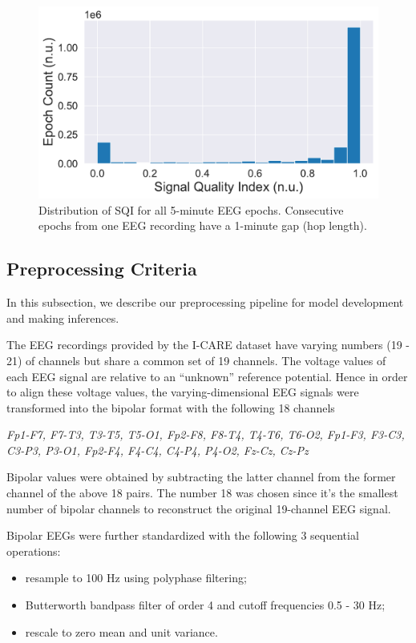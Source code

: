 \begin{figure}[!htp]
\centering
\includegraphics[width=0.95\linewidth]{images/sqi-stats.pdf}
\caption[]{Distribution of SQI for all 5-minute EEG epochs. Consecutive epochs from one EEG recording have a 1-minute gap (hop length).}
\label{fig:sqi-stats}
\end{figure}


\subsection{Preprocessing Criteria}
\label{subsec:data_preproc}

In this subsection, we describe our preprocessing pipeline for model development and making inferences.

The EEG recordings provided by the I-CARE dataset have varying numbers (19 - 21) of channels but share a common set of 19 channels. The voltage values of each EEG signal are relative to an ``unknown'' reference potential. Hence in order to align these voltage values, the varying-dimensional EEG signals were transformed into the bipolar format with the following 18 channels
\begin{indentedquote}{0.3in}
\it Fp1-F7, F7-T3, T3-T5, T5-O1, Fp2-F8, F8-T4, T4-T6, T6-O2, Fp1-F3, F3-C3, C3-P3, P3-O1, Fp2-F4, F4-C4, C4-P4, P4-O2, Fz-Cz, Cz-Pz
\end{indentedquote}
Bipolar values were obtained by subtracting the latter channel from the former channel of the above 18 pairs. The number 18 was chosen since it's the smallest number of bipolar channels to reconstruct the original 19-channel EEG signal.

Bipolar EEGs were further standardized with the following 3 sequential operations:
\begin{itemize}
    \item resample to 100 Hz using polyphase filtering;
    \item Butterworth bandpass filter of order 4 and cutoff frequencies 0.5 - 30 Hz;
    \item rescale to zero mean and unit variance.
\end{itemize}


